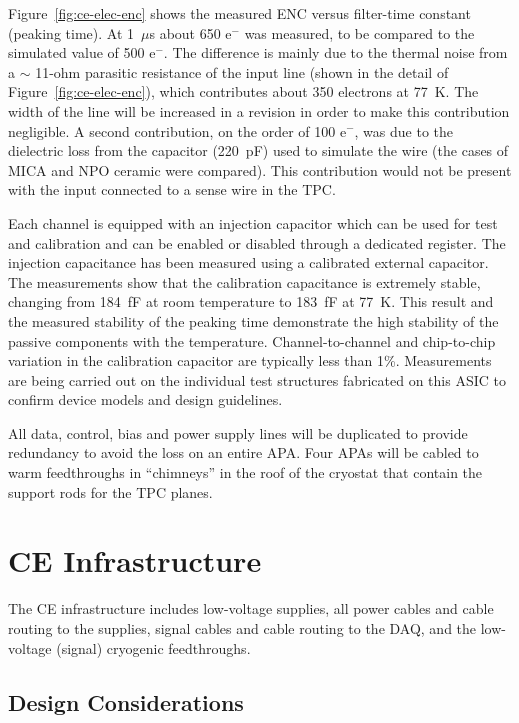 Figure~\ref{fig:ce-elec-enc} shows the measured ENC versus filter-time constant (peaking time).
At 1~$\mu$s about 650 e$^{-}$ was measured,
to be compared to the simulated value of 500 e$^{-}$. The difference is
mainly due to the thermal noise from a $\sim$
11-ohm parasitic resistance of the input
line (shown in the detail of Figure~\ref{fig:ce-elec-enc}), which contributes about 350
electrons at 77~K. The width of the line will be increased in a
revision in order to make this contribution negligible. A second
contribution, on the order of 100 e$^{-}$, was due to the dielectric
loss from the  capacitor (220~pF) used to simulate the wire (the cases of MICA and NPO ceramic were compared). This contribution would not be
present with the input connected to a sense wire in the TPC.

Each channel is equipped with an injection capacitor which can be used
for test and calibration and can be enabled or disabled through a
dedicated register. The injection capacitance has been measured using 
a calibrated external capacitor. The measurements show
that the calibration capacitance is extremely stable, changing from
184~fF at room temperature to 183~fF at 77~K. This result and the measured
stability of the peaking time demonstrate the high stability of the
passive components with the temperature. Channel-to-channel and chip-to-chip
variation in the calibration capacitor are typically less than 1\%. Measurements are being carried
out on the individual test structures fabricated on this ASIC to
confirm device models and design guidelines.

All data, control, bias and power supply lines will be duplicated to
provide redundancy to avoid the loss on an entire APA.  Four APAs will be
cabled to warm feedthroughs in ``chimneys'' in the roof of the cryostat that
contain the support rods for the TPC planes.

\section{CE Infrastructure}
\label{sec:ce-feedthru}
   
The CE infrastructure includes low-voltage supplies, all power cables and cable routing to the supplies,
signal cables and cable routing to the DAQ, and the low-voltage (signal) cryogenic feedthroughs.

\subsection{Design Considerations} 
\label{subsec:ce-feedthru-reqs-n-specs}

